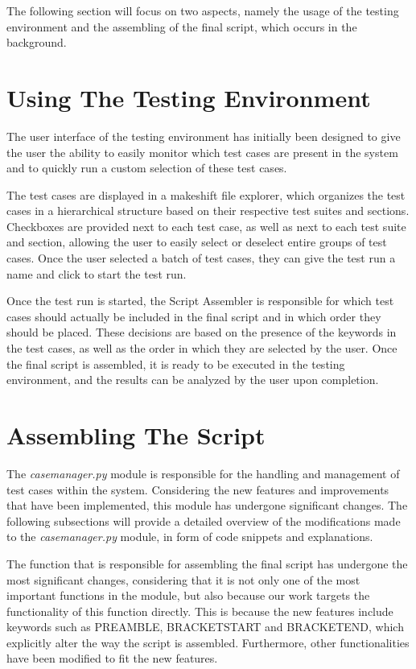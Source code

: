 
The following section will focus on two aspects, namely the usage of the testing environment and the assembling of the final script, which occurs in the background.

\section{Using The Testing Environment}

The user interface of the testing environment has initially been designed to give the user the ability to easily monitor which test cases are present in the system and to quickly run a custom selection of these test cases. 

The test cases are displayed in a makeshift file explorer, which organizes the test cases in a hierarchical structure based on their respective test suites and sections. Checkboxes are provided next to each test case, as well as next to each test suite and section, allowing the user to easily select or deselect entire groups of test cases. Once the user selected a batch of test cases, they can give the test run a name and click to start the test run. 

Once the test run is started, the Script Assembler is responsible for which test cases should actually be included in the final script and in which order they should be placed. These decisions are based on the presence of the keywords in the test cases, as well as the order in which they are selected by the user. Once the final script is assembled, it is ready to be executed in the testing environment, and the results can be analyzed by the user upon completion. 

\section{Assembling The Script}

The \textit{casemanager.py} module is responsible for the handling and management of test cases within the system. Considering the new features and improvements that have been implemented, this module has undergone significant changes. The following subsections will provide a detailed overview of the modifications made to the \textit{casemanager.py} module, in form of code snippets and explanations.

The function that is responsible for assembling the final script has undergone the most significant changes, considering that it is not only one of the most important functions in the module, but also because our work targets the functionality of this function directly. This is because the new features include keywords such as PREAMBLE, BRACKETSTART and BRACKETEND, which explicitly alter the way the script is assembled. Furthermore, other functionalities have been modified to fit the new features.

